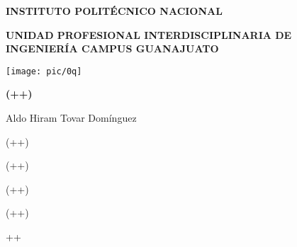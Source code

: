 \documentclass{article}
\begin{document}
\begin{titlepage}
	\begin{center}

		\huge
		\textbf{INSTITUTO POLITÉCNICO NACIONAL}
		
		\vspace{0.5cm}
		\textbf{UNIDAD PROFESIONAL INTERDISCIPLINARIA DE INGENIERÍA
		CAMPUS GUANAJUATO}
		
		\vspace{1.5cm}

		\texttt{[image: pic/0q]}

		\vfill
		\textbf{(++)} %

		Aldo Hiram Tovar Domínguez

		(++)%
			
		(++)%

		(++)%

		(++)%
			
		\vspace{3cm}
	\end{center}
\end{titlepage}

\pagebreak


{++}
\end{document}
